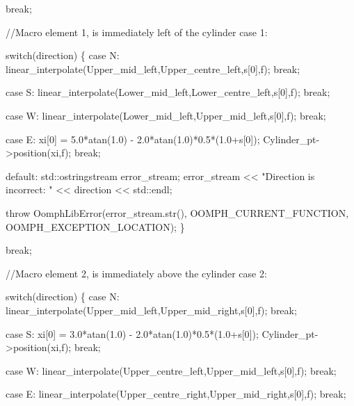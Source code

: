 \begin{DoxyCodeInclude}
    \textcolor{keywordflow}{break};
    
    \textcolor{comment}{//Macro element 1, is immediately left of the cylinder}
   \textcolor{keywordflow}{case} 1:
    
    \textcolor{keywordflow}{switch}(direction)
     \{
     \textcolor{keywordflow}{case} N:
       linear\_interpolate(Upper\_mid\_left,Upper\_centre\_left,s[0],f);
      \textcolor{keywordflow}{break};

     \textcolor{keywordflow}{case} S:  
       linear\_interpolate(Lower\_mid\_left,Lower\_centre\_left,s[0],f);
      \textcolor{keywordflow}{break};

     \textcolor{keywordflow}{case} W:
       linear\_interpolate(Lower\_mid\_left,Upper\_mid\_left,s[0],f);
      \textcolor{keywordflow}{break};

     \textcolor{keywordflow}{case} E:
      xi[0] = 5.0*atan(1.0) - 2.0*atan(1.0)*0.5*(1.0+s[0]);
      Cylinder\_pt->position(xi,f);
      \textcolor{keywordflow}{break};

     \textcolor{keywordflow}{default}:
      std::ostringstream error\_stream;
      error\_stream << \textcolor{stringliteral}{"Direction is incorrect: "} << direction << std::endl;
      
      \textcolor{keywordflow}{throw} OomphLibError(error\_stream.str(),
                          OOMPH\_CURRENT\_FUNCTION,
                          OOMPH\_EXCEPTION\_LOCATION);
     \}
    
    \textcolor{keywordflow}{break};

   \textcolor{comment}{//Macro element 2, is immediately above the cylinder}
   \textcolor{keywordflow}{case} 2:
    
    \textcolor{keywordflow}{switch}(direction)
     \{
     \textcolor{keywordflow}{case} N:
       linear\_interpolate(Upper\_mid\_left,Upper\_mid\_right,s[0],f);
      \textcolor{keywordflow}{break};
      
     \textcolor{keywordflow}{case} S:  
      xi[0] = 3.0*atan(1.0) - 2.0*atan(1.0)*0.5*(1.0+s[0]);
      Cylinder\_pt->position(xi,f);
      \textcolor{keywordflow}{break};

     \textcolor{keywordflow}{case} W:
       linear\_interpolate(Upper\_centre\_left,Upper\_mid\_left,s[0],f);
      \textcolor{keywordflow}{break};

     \textcolor{keywordflow}{case} E:
       linear\_interpolate(Upper\_centre\_right,Upper\_mid\_right,s[0],f);
      \textcolor{keywordflow}{break};


\end{DoxyCodeInclude}
